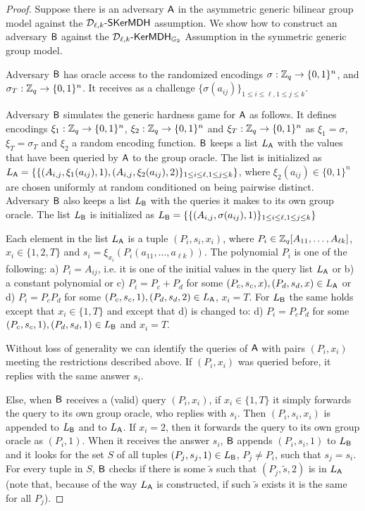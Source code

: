 \begin{proof} Suppose there is an adversary $\mathsf{A}$  in the asymmetric generic bilinear group model against the $\mathcal{D}_{\ell,k}\mbox{-}\mathsf{SKerMDH}$ assumption.  We show how to construct an adversary $\mathsf{B}$ against the  $\mathcal{D}_{\ell,k}\mbox{-}\mathsf{KerMDH}_{\mathbb{G}_2}$ Assumption in the symmetric generic group model. 


Adversary $\mathsf{B}$ has oracle access to the randomized encodings $\sigma: \mathbb{Z}_q \to \{0,1\}^n$, 
and $\sigma_T: \mathbb{Z}_q \to \{0,1\}^n$. It receives as a challenge $\{ \sigma(a_{ij})\}_{1\leq i \leq \ell, 1\leq j \leq k}$.

Adversary $\mathsf{B}$ simulates the generic hardness game for $\mathsf{A}$ as follows. It defines encodings  $\xi_1: \mathbb{Z}_q \to \{0,1\}^n$, $\xi_2: \mathbb{Z}_q \to \{0,1\}^n$ and $\xi_T: \mathbb{Z}_q \to \{0,1\}^n$ as $\xi_1=\sigma$, $\xi_T=\sigma_T$ and $\xi_2$ a random encoding function. $\mathsf{B}$ keeps a list $L_{\mathsf{A}}$  with the values that have been queried by $\mathsf{A}$ to the group oracle. The list is initialized as 
$L_{\mathsf{A}}=\{  \{(A_{i,j},\xi_1(a_{ij}),1),(A_{i,j},\xi_2(a_{ij}),2)\}_{1\leq i \leq \ell, 1\leq j \leq k}\}$, where $\xi_2(a_{ij}) \in \{0,1\}^n$ are chosen uniformly at random conditioned on being pairwise distinct.  Adversary $\mathsf{B}$ also keeps a list $L_{\mathsf{B}}$ with the queries 
it makes to its own group oracle. The list $L_{\mathsf{B}}$ is initialized as 
$L_{\mathsf{B}}=\{  \{(A_{i,j},\sigma(a_{ij}),1)\}_{1\leq i \leq \ell, 1\leq j \leq k}\}$

Each element in the list $L_{\mathsf{A}}$ is a tuple $(P_i,s_i,x_i)$, where $P_i \in \mathbb{Z}_q[A_{11}, \ldots,A_{\ell k}]$, $x_i \in \{1,2,T\}$ and $s_i=\xi_{x_i}(P_i(a_{11},\ldots,a_{\ell k}))$. The polynomial $P_i$ is one of the following:  a) $P_i=A_{ij}$, i.e. it is one of the initial values in the query list  
$L_{\mathsf{A}}$  or b) a constant polynomial or c) $P_i=P_c+P_d$ for some $(P_c,s_c,x),(P_d,s_d,x) \in L_{\mathsf{A}}$ or d) $P_i=P_cP_d$ for some $(P_c,s_c,1),(P_d,s_d,2) \in L_{\mathsf{A}}$, $x_i=T$. For $L_{\mathsf{B}}$ the same holds except that $x_i \in \{1,T\}$ and except that d) is changed to: d) $P_i=P_cP_d$ for some $(P_c,s_c,1),(P_d,s_d,1) \in L_{\mathsf{B}}$ and $x_i=T$. 

Without loss of generality we can identify the queries of $\mathsf{A}$ with 
pairs $(P_i,x_i)$ meeting the restrictions described above. If $(P_i,x_i)$ was queried before, it replies with the same answer $s_i$.

Else, when $\mathsf{B}$ receives a (valid) query $(P_i,x_i)$, if $x_i \in \{1,T\}$ it simply forwards  the query to its own group oracle, who replies with $s_i$. Then $(P_i,s_i,x_i)$ is appended to $L_{\mathsf{B}}$ and to $L_{\mathsf{A}}$. If $x_i =2$, then it forwards the query to its own group oracle as $(P_i,1)$. When it receives the answer $s_i$, 
$\mathsf{B}$ appends $(P_i,s_i,1)$ to $L_{\mathsf{B}}$ and it looks for the set $S$ of all  tuples $(P_j,s_j,1) \in L_{\mathsf{B}}$, $P_j \neq P_i$,  such that $s_j=s_i$. 
For every tuple in $S$, $\mathsf{B}$ checks if there is some $\tilde{s}$ such that $(P_j,\tilde{s},2)$ is in $L_{\mathsf{A}}$ (note that, because of the way $L_{\mathsf{A}}$ is constructed, if such $\tilde{s}$ exists it is the same for all $P_j$). 


\end{proof}
